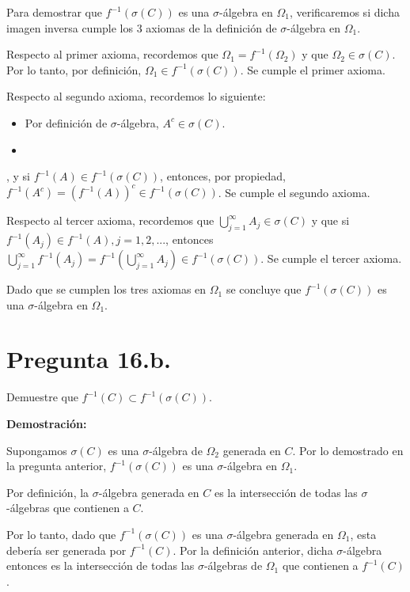 \documentclass[11pt]{article}
\begin{document}
Para demostrar que $\mathit{f}^{-1}(\sigma(C))$ es una $\sigma$-álgebra en $\Omega_{1}$, verificaremos si dicha imagen inversa cumple los 3 axiomas de la definición de $\sigma$-álgebra en $\Omega_{1}$. 

Respecto al primer axioma, recordemos que $\Omega_{1} = \mathit{f}^{-1}(\Omega_{2})$ y que $\Omega_{2} \in \sigma(C)$. Por lo tanto, por definición, $\Omega_{1} \in \mathit{f}^{-1}(\sigma(C))$. Se cumple el primer axioma.

Respecto al segundo axioma, recordemos lo siguiente:
\begin{itemize}
	\item Por definición de $\sigma$-álgebra, $\mathit{A}^{c} \in \sigma(C)$.
	\item 
\end{itemize}
, y si $\mathit{f}^{-1}(A) \in \mathit{f}^{-1}(\sigma(C))$, entonces, por propiedad, $\mathit{f}^{-1}(A^{c}) = (\mathit{f}^{-1}(A))^{c} \in \mathit{f}^{-1}(\sigma(C))$. Se cumple el segundo axioma.

Respecto al tercer axioma, recordemos que $\bigcup^{\infty}_{j=1} A_{j} \in \sigma(C)$ y que si $\mathit{f}^{-1}(A_{j}) \in \mathit{f}^{-1}(A), j=1,2, ... $, entonces $\bigcup_{j=1}^{\infty} \mathit{f}^{-1}(A_j) = \mathit{f}^{-1}(\bigcup_{j=1}^{\infty}A_j) \in \mathit{f}^{-1}(\sigma(C))$. Se cumple el tercer axioma.

Dado que se cumplen los tres axiomas en $\Omega_{1}$ se concluye que $\mathit{f}^{-1} (\sigma(C))$ es una $\sigma$-álgebra en $\Omega_{1}$.

\section{Pregunta 16.b.}

Demuestre que $\mathit{f}^{-1} (C) \subset \mathit{f}^{-1} (\sigma(C))$.

\textbf{Demostración:}

Supongamos $\sigma(C)$ es una $\sigma$-álgebra de $\Omega_2$ generada en $C$. Por lo demostrado en la pregunta anterior, $\mathit{f}^{-1} (\sigma(C))$ es una $\sigma$-álgebra en $\Omega_{1}$.

Por definición, la $\sigma$-álgebra generada en $C$ es la intersección de todas las $\sigma$-álgebras que contienen a $C$. 

Por lo tanto, dado que $\mathit{f}^{-1} (\sigma(C))$ es una $\sigma$-álgebra generada en $\Omega_{1}$, esta debería ser generada por $\mathit{f}^{-1}(C)$. Por la definición anterior, dicha $\sigma$-álgebra entonces es la intersección de todas las $\sigma$-álgebras de $\Omega_{1}$ que contienen a $\mathit{f}^{-1}(C)$.
\end{document}
